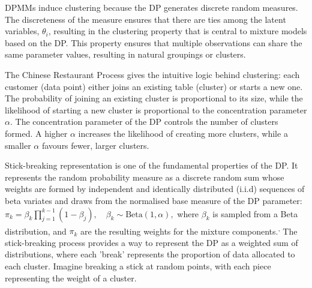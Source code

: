 \documentclass[12pt]{report} %
\begin{document}
DPMMs induce clustering because the DP generates discrete random measures. The discreteness of the measure ensures that there are ties among the latent variables, $\theta_i$, resulting in the clustering property that is central to mixture models based on the DP.\cite{Gorur2010} This property ensures that multiple observations can share the same parameter values, resulting in natural groupings or clusters. 

The Chinese Restaurant Process gives the intuitive logic behind clustering: each customer (data point) either joins an existing table (cluster) or starts a new one.\cite{Gorur2010} The probability of joining an existing cluster is proportional to its size, while the likelihood of starting a new cluster is proportional to the concentration parameter $\alpha$.\cite{Gorur2010} The concentration parameter of the DP controls the number of clusters formed. A higher \( \alpha \) increases the likelihood of creating more clusters, while a smaller \( \alpha \) favours fewer, larger clusters.

Stick-breaking representation is one of the fundamental properties of the DP.\cite{lee2020new} It represents the random probability measure as a discrete random sum whose weights are formed by independent and identically distributed (i.i.d) sequences of beta variates and draws from the normalised base measure of the DP parameter: \newline $\pi_k = \beta_k \prod_{j=1}^{k-1} (1 - \beta_j), \quad \beta_k \sim \text{Beta}(1, \alpha),$ where \( \beta_k \) is sampled from a Beta distribution, and \( \pi_k \) are the resulting weights for the mixture components.\cite{lee2020new}\textsuperscript{,}\cite{broderick2012beta} The stick-breaking process provides a way to represent the DP as a weighted sum of distributions, where each 'break' represents the proportion of data allocated to each cluster. Imagine breaking a stick at random points, with each piece representing the weight of a cluster.
\end{document}

